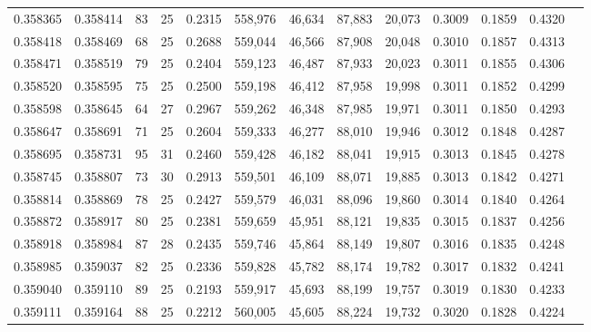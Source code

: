 \begin{tabular}{rrrrrrrrrrrrr}
0.358365 & 0.358414 &    83 &  25 &                                     0.2315 & 558,976 &  46,634 &  87,883 &  20,073 & 0.3009 & 0.1859 & 0.4320 \\
0.358418 & 0.358469 &    68 &  25 &                                     0.2688 & 559,044 &  46,566 &  87,908 &  20,048 & 0.3010 & 0.1857 & 0.4313 \\
0.358471 & 0.358519 &    79 &  25 &                                     0.2404 & 559,123 &  46,487 &  87,933 &  20,023 & 0.3011 & 0.1855 & 0.4306 \\
0.358520 & 0.358595 &    75 &  25 &                                     0.2500 & 559,198 &  46,412 &  87,958 &  19,998 & 0.3011 & 0.1852 & 0.4299 \\
0.358598 & 0.358645 &    64 &  27 &                                     0.2967 & 559,262 &  46,348 &  87,985 &  19,971 & 0.3011 & 0.1850 & 0.4293 \\
0.358647 & 0.358691 &    71 &  25 &                                     0.2604 & 559,333 &  46,277 &  88,010 &  19,946 & 0.3012 & 0.1848 & 0.4287 \\
0.358695 & 0.358731 &    95 &  31 &                                     0.2460 & 559,428 &  46,182 &  88,041 &  19,915 & 0.3013 & 0.1845 & 0.4278 \\
0.358745 & 0.358807 &    73 &  30 &                                     0.2913 & 559,501 &  46,109 &  88,071 &  19,885 & 0.3013 & 0.1842 & 0.4271 \\
0.358814 & 0.358869 &    78 &  25 &                                     0.2427 & 559,579 &  46,031 &  88,096 &  19,860 & 0.3014 & 0.1840 & 0.4264 \\
0.358872 & 0.358917 &    80 &  25 &                                     0.2381 & 559,659 &  45,951 &  88,121 &  19,835 & 0.3015 & 0.1837 & 0.4256 \\
0.358918 & 0.358984 &    87 &  28 &                                     0.2435 & 559,746 &  45,864 &  88,149 &  19,807 & 0.3016 & 0.1835 & 0.4248 \\
0.358985 & 0.359037 &    82 &  25 &                                     0.2336 & 559,828 &  45,782 &  88,174 &  19,782 & 0.3017 & 0.1832 & 0.4241 \\
0.359040 & 0.359110 &    89 &  25 &                                     0.2193 & 559,917 &  45,693 &  88,199 &  19,757 & 0.3019 & 0.1830 & 0.4233 \\
0.359111 & 0.359164 &    88 &  25 &                                     0.2212 & 560,005 &  45,605 &  88,224 &  19,732 & 0.3020 & 0.1828 & 0.4224 \\

\end{tabular}
